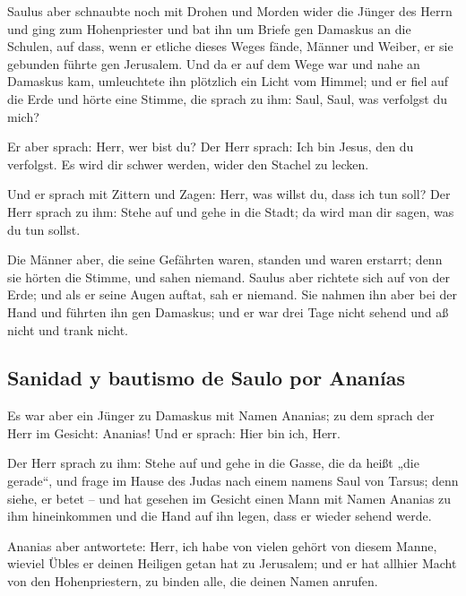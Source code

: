  Saulus aber schnaubte noch mit Drohen und Morden wider
die Jünger des Herrn und ging zum Hohenpriester  und bat
ihn um Briefe gen Damaskus an die Schulen, auf dass, wenn er etliche
dieses Weges fände, Männer und Weiber, er sie gebunden führte gen
Jerusalem.  Und da er auf dem Wege war und nahe an
Damaskus kam, umleuchtete ihn plötzlich ein Licht vom Himmel;
 und er fiel auf die Erde und hörte eine Stimme, die
sprach zu ihm: Saul, Saul, was verfolgst du mich?

 Er aber sprach: Herr, wer bist du? Der Herr sprach: Ich
bin Jesus, den du verfolgst. Es wird dir schwer werden, wider den
Stachel zu lecken.

 Und er sprach mit Zittern und Zagen: Herr, was willst du,
dass ich tun soll? Der Herr sprach zu ihm: Stehe auf und gehe in die
Stadt; da wird man dir sagen, was du tun sollst.

 Die Männer aber, die seine Gefährten waren, standen und
waren erstarrt; denn sie hörten die Stimme, und sahen niemand.
 Saulus aber richtete sich auf von der Erde; und als er
seine Augen auftat, sah er niemand. Sie nahmen ihn aber bei der Hand und
führten ihn gen Damaskus;  und er war drei Tage nicht
sehend und aß nicht und trank nicht.

\hypertarget{sanidad-y-bautismo-de-saulo-por-ananuxedas}{%
\subsection{Sanidad y bautismo de Saulo por
Ananías}\label{sanidad-y-bautismo-de-saulo-por-ananuxedas}}

 Es war aber ein Jünger zu Damaskus mit Namen Ananias; zu
dem sprach der Herr im Gesicht: Ananias! Und er sprach: Hier bin ich,
Herr.

 Der Herr sprach zu ihm: Stehe auf und gehe in die Gasse,
die da heißt „die gerade``, und frage im Hause des Judas nach einem
namens Saul von Tarsus; denn siehe, er betet --  und hat
gesehen im Gesicht einen Mann mit Namen Ananias zu ihm hineinkommen und
die Hand auf ihn legen, dass er wieder sehend werde.

 Ananias aber antwortete: Herr, ich habe von vielen
gehört von diesem Manne, wieviel Übles er deinen Heiligen getan hat zu
Jerusalem;  und er hat allhier Macht von den
Hohenpriestern, zu binden alle, die deinen Namen anrufen.

